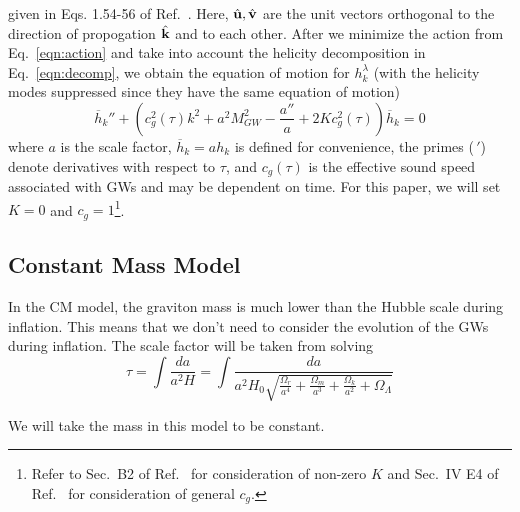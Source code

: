 \documentclass[prd,twocolumn,aps,psfig,nofootinbib,nobibnotes,superscriptaddress,preprintnumbers,times]{revtex4-2}
\begin{document}
\hspace{-1em}given in Eqs. 1.54-56 of Ref.\ \cite{Maggiore:v1}. Here, $\hat{\bf u}, \hat{\bf v}$ are the unit vectors orthogonal to the direction of propogation $\hat{\bf k}$ and to each other. After we minimize the action from Eq.\ \ref{eqn:action} and take into account the helicity decomposition in Eq.\ \ref{eqn:decomp}, we obtain the equation of motion for $h_k^\lambda$ (with the helicity modes suppressed since they have the same equation of motion)
\begin{equation}\label{eqn:eom}
    \overline{h}_k'' + \left(c_g^2(\tau) k^2 + a^2 M_{GW}^2 - \frac{a''}{a} + 2Kc_g^2(\tau)\right)\overline{h}_k = 0
\end{equation}
where $a$ is the scale factor, $\overline{h}_k = ah_k$ is defined for convenience, the primes ($\,'$) denote derivatives with respect to $\tau$, and $c_g(\tau)$ is the effective sound speed associated with GWs and may be dependent on time. For this paper, we will set $K = 0$ and $c_g = 1$\footnote{Refer to Sec.\ B2 of Ref.\ \cite{Gumrukcuoglu:2012} for consideration of non-zero $K$ and Sec.\ IV E4 of Ref.\ \cite{Gumrukcuoglu:2012} for consideration of general $c_g$.}.

\subsection{Constant Mass Model}
In the CM model, the graviton mass is much lower than the Hubble scale during inflation. This means that we don't need to consider the evolution of the GWs during inflation. The scale factor will be taken from solving
\begin{equation}\label{eqn:tau}
    \tau = \int \frac{da}{a^2H} = \int \frac{da}{a^2H_0\sqrt{\frac{\Omega_r}{a^4} + \frac{\Omega_m}{a^3}+ \frac{\Omega_k}{a^2}+\Omega_\Lambda}}
\end{equation}

We will take the mass in this model to be constant.

\end{document}
